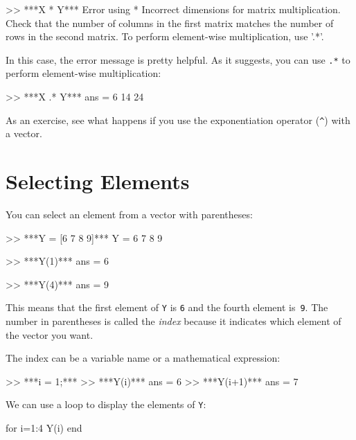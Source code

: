\begin{code}
>> ***X * Y***
Error using  * 
Incorrect dimensions for matrix multiplication. 
Check that the number of columns in the first matrix 
matches the number of rows in the second matrix.
To perform element-wise multiplication, use '.*'.
\end{code}

In this case, the error message is pretty helpful.  As it suggests, you can use \lstinline{.*} to perform element-wise multiplication:


\begin{code}
>> ***X .* Y***
ans = 6    14    24
\end{code}

As an exercise, see what happens if you use the exponentiation operator 
(\lstinline{^}) with a vector.

\section{Selecting Elements}


You can select an element from a vector with parentheses:

\begin{code}
>> ***Y = [6 7 8 9]***
Y = 6    7     8     9

>> ***Y(1)***
ans = 6

>> ***Y(4)***
ans = 9
\end{code}

This means that the first element of \lstinline{Y} is \lstinline{6} and the
fourth element is~\lstinline{9}.
The number in parentheses is called the \emph{index} because it indicates which element of the vector you want.


The index can be a variable name or a mathematical expression:

\begin{code}
>> ***i = 1;***
>> ***Y(i)***
ans = 6
>> ***Y(i+1)***
ans = 7
\end{code}
\newpage
We can use a loop to display the elements of \lstinline{Y}:


\begin{code}
for i=1:4
     Y(i)
end
\end{code}

